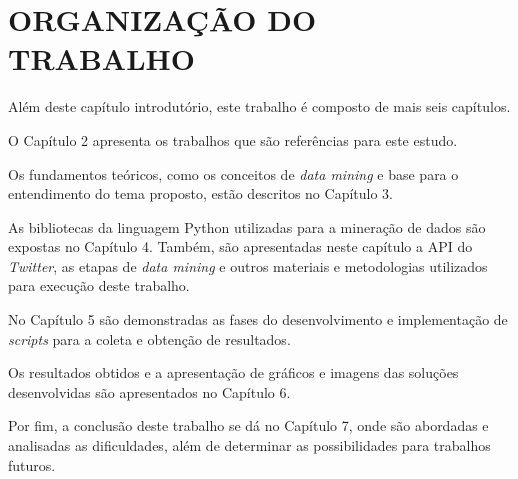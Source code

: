 \section{ORGANIZAÇÃO DO TRABALHO}\label{sec:organizacao-trabalho}

Além deste capítulo introdutório, este trabalho é composto de mais seis capítulos.

O Capítulo 2 apresenta os trabalhos que são referências para este estudo.

Os fundamentos teóricos, como os conceitos de \textit{data mining} e base para o entendimento do tema proposto, estão descritos no Capítulo 3.

As bibliotecas da linguagem Python utilizadas para a mineração de dados são expostas no Capítulo 4. Também, são apresentadas neste capítulo a API do \textit{Twitter}, as etapas de \textit{data mining} e outros materiais e metodologias utilizados para execução deste trabalho.

No Capítulo 5 são demonstradas as fases do desenvolvimento e implementação de \textit{scripts} para a coleta e obtenção de resultados.

Os resultados obtidos e a apresentação de gráficos e imagens das soluções desenvolvidas são apresentados no Capítulo 6.

Por fim, a conclusão deste trabalho se dá no Capítulo 7, onde são abordadas e analisadas as dificuldades, além de determinar as possibilidades para trabalhos futuros.
